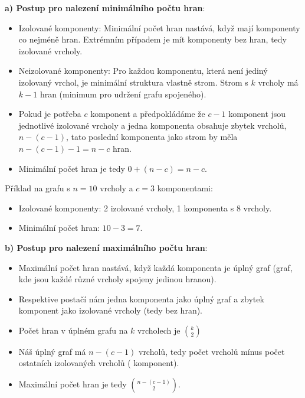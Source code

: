 \documentclass[10pt, a4paper]{ReportSheet}
\begin{document}
    \textbf{a) Postup pro nalezení minimálního počtu hran}:
    \begin{itemize}
        \item Izolované komponenty: Minimální počet hran nastává, když mají komponenty co nejméně hran. Extrémním
        případem je mít komponenty bez hran, tedy izolované vrcholy.
        \item Neizolované komponenty: Pro každou komponentu, která není jediný izolovaný vrchol, je minimální
        struktura vlastně strom. Strom s $k$ vrcholy má $k-1$ hran (minimum pro udržení grafu spojeného).
        \item Pokud je potřeba $c$ komponent a předpokládáme že $c-1$ komponent jsou jednotlivé izolované vrcholy a jedna komponenta obsahuje zbytek vrcholů, $n-(c-1)$, tato poslední komponenta jako strom by měla $n-(c-1)-1=n-c$ hran.
        \item Minimální počet hran je tedy $0 + (n-c) = n-c$.
    \end{itemize}

    Příklad na grafu s $n=10$ vrcholy a $c=3$ komponentami:
    \begin{itemize}
        \item Izolované komponenty: 2 izolované vrcholy, 1 komponenta s 8 vrcholy.
        \item Minimální počet hran: $10 - 3 = 7$.
    \end{itemize}


    \textbf{b) Postup pro nalezení maximálního počtu hran}:
    \begin{itemize}
        \item Maximální počet hran nastává, když každá komponenta je úplný graf (graf, kde jsou každé různé vrcholy spojeny jedinou hranou).
        \item Respektive postačí nám jedna komponenta jako úplný graf a zbytek komponent jako izolované vrcholy (tedy
        bez hran).
        \item Počet hran v úplném grafu na $k$ vrcholech je $\binom{k}{2}$
        \item Náš úplný graf má $n-(c-1)$ vrcholů, tedy počet vrcholů mínus počet ostatních izolovaných vrcholů (
        komponent).
        \item Maximální počet hran je tedy $\binom{n-(c-1)}{2}$.
    \end{itemize}
\end{document}
